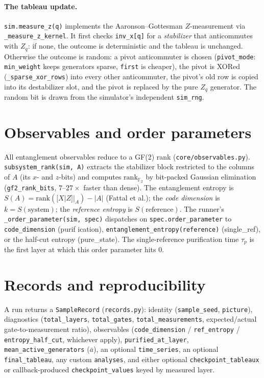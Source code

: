 \documentclass[11pt]{article}
\newcommand{\F}{\mathbb{F}}
\newcommand{\code}[1]{\texttt{#1}}
\newcommand{\file}[1]{\texttt{#1}}
\begin{document}
\paragraph{The tableau update.} \code{sim.measure\_z(q)} implements the Aaronson--Gottesman $Z$-measurement via
\code{\_measure\_z\_kernel}. It first checks \code{inv\_x[q]} for a \emph{stabilizer} that anticommutes with
$Z_q$: if none, the outcome is deterministic and the tableau is unchanged. Otherwise the outcome is random: a
pivot anticommuter is chosen (\code{pivot\_mode}: \code{min\_weight} keeps generators sparse, \code{first} is
cheaper), the pivot is XORed (\code{\_sparse\_xor\_rows}) into every other anticommuter, the pivot's old row is
copied into its destabilizer slot, and the pivot is replaced by the pure $Z_q$ generator. The random bit is
drawn from the simulator's independent \code{sim\_rng}.

\section{Observables and order parameters}
\label{sec:observables}
All entanglement observables reduce to a GF(2) rank (\file{core/observables.py}). \code{subsystem\_rank(sim, A)}
extracts the stabilizer block restricted to the columns of $A$ (its $x$- and $z$-bits) and computes
$\mathrm{rank}_{\F_2}$ by bit-packed Gaussian elimination (\code{gf2\_rank\_bits}, $7$--$27\times$ faster than
dense). The entanglement entropy is $S(A)=\mathrm{rank}([X|Z]|_A)-|A|$ (Fattal et al.); the
\emph{code dimension} is $k=S(\text{system})$; the \emph{reference entropy} is $S(\text{reference})$. The runner's
\code{\_order\_parameter(sim, spec)} dispatches on \code{spec.order\_parameter} to \code{code\_dimension} (purif\-
ication), \code{entanglement\_entropy(reference)} (single\_ref), or the half-cut entropy (pure\_state). The
single-reference purification time $\tau_p$ is the first layer at which this order parameter hits $0$.

\section{Records and reproducibility}
\label{sec:records}
A run returns a \code{SampleRecord} (\file{records.py}): identity (\code{sample\_seed}, \code{picture}),
diagnostics (\code{total\_layers}, \code{total\_gates}, \code{total\_measurements}, expected/actual
gate-to-measurement ratio), observables (\code{code\_dimension} / \code{ref\_entropy} / \code{entropy\_half\_cut},
whichever apply), \code{purified\_at\_layer}, \code{mean\_active\_generators} ($\bar a$), an optional
\code{time\_series}, an optional \code{final\_tableau}, any custom \code{analyses}, and either optional
\code{checkpoint\_tableaux} or callback-produced \code{checkpoint\_values} keyed by measured layer.
\end{document}
